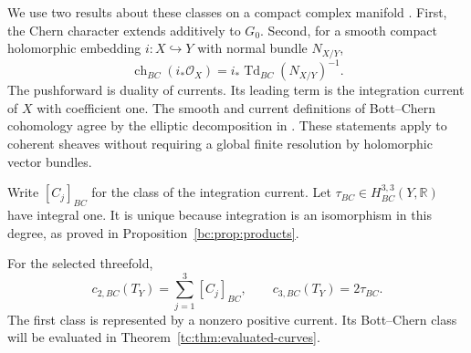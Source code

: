 We use two results about these classes on a compact complex
manifold \cite[Sections~2 and~8, Theorem~9.2]{BSWCoherent}.
First, the Chern character extends additively to $G_0$.
Second, for a smooth compact holomorphic embedding
$i:X\hookrightarrow Y$ with normal bundle $N_{X/Y}$,
\begin{equation}\label{tc:eq:embedding-RR}
 \operatorname{ch}_{BC}(i_*\mathcal O_X)
                 =i_*\operatorname{Td}_{BC}(N_{X/Y})^{-1}.
\end{equation}
The pushforward is duality of currents.
Its leading term is the integration current of $X$ with
coefficient one. The smooth and current definitions of
Bott--Chern cohomology agree by the elliptic decomposition
in \cite[Section~2.2]{BSWCoherent}.
These statements apply to coherent sheaves without requiring
a global finite resolution by holomorphic vector bundles.

Write $[C_j]_{BC}$ for the class of the integration current.
Let $\tau_{BC}\in H_{BC}^{3,3}(Y,\mathbb R)$ have integral one.
It is unique because integration is an isomorphism in this degree,
as proved in Proposition~\ref{bc:prop:products}.

\begin{theorem}\label{tc:thm:tangent-Chern}
For the selected threefold,
\begin{equation}\label{tc:eq:tangent-Chern}
 c_{2,BC}(T_Y)=\sum_{j=1}^3[C_j]_{BC},\qquad
 c_{3,BC}(T_Y)=2\tau_{BC}.
\end{equation}
The first class is represented by a nonzero positive current.
Its Bott--Chern class will be evaluated in
Theorem~\ref{tc:thm:evaluated-curves}.
\end{theorem}

